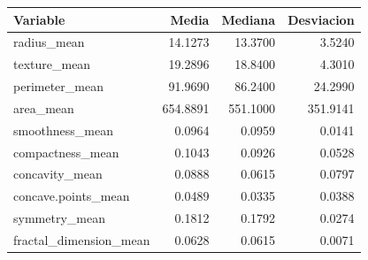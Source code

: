 \begin{tabular}{lrrr}
\toprule
Variable & Media & Mediana & Desviacion \\
\midrule
radius\_mean & 14.1273 & 13.3700 & 3.5240 \\
texture\_mean & 19.2896 & 18.8400 & 4.3010 \\
perimeter\_mean & 91.9690 & 86.2400 & 24.2990 \\
area\_mean & 654.8891 & 551.1000 & 351.9141 \\
smoothness\_mean & 0.0964 & 0.0959 & 0.0141 \\
compactness\_mean & 0.1043 & 0.0926 & 0.0528 \\
concavity\_mean & 0.0888 & 0.0615 & 0.0797 \\
concave.points\_mean & 0.0489 & 0.0335 & 0.0388 \\
symmetry\_mean & 0.1812 & 0.1792 & 0.0274 \\
fractal\_dimension\_mean & 0.0628 & 0.0615 & 0.0071 \\
\bottomrule
\end{tabular}
